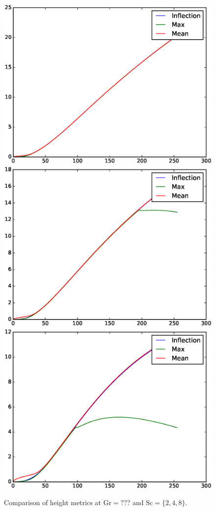 \begin{figure}
\includegraphics[width=\columnwidth]{figs/comp-height-0.0008-0.0002.eps}
\includegraphics[width=\columnwidth]{figs/comp-height-0.0008-0.0004.eps}
\includegraphics[width=\columnwidth]{figs/comp-height-0.0008-0.0008.eps}
\caption{ 
  Comparison of height metrics at $\text{Gr} = ???$ and $\text{Sc} = \{2, 4, 8\}$.
}
\end{figure}

